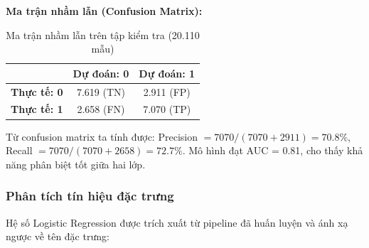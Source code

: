 \textbf{Ma trận nhầm lẫn (Confusion Matrix):}

\begin{table}[h]
\centering
\begin{tabular}{|l|c|c|}
\hline
 & \textbf{Dự đoán: 0} & \textbf{Dự đoán: 1} \\
\hline
\textbf{Thực tế: 0} & 7.619 (TN) & 2.911 (FP) \\
\hline
\textbf{Thực tế: 1} & 2.658 (FN) & 7.070 (TP) \\
\hline
\end{tabular}
\caption{Ma trận nhầm lẫn trên tập kiểm tra (20.110 mẫu)}
\end{table}

Từ confusion matrix ta tính được: Precision $= 7070/(7070+2911) = 70.8\%$, Recall $= 7070/(7070+2658) = 72.7\%$. Mô hình đạt AUC = 0.81, cho thấy khả năng phân biệt tốt giữa hai lớp.

\subsubsection{Phân tích tín hiệu đặc trưng}

Hệ số Logistic Regression được trích xuất từ pipeline đã huấn luyện và ánh xạ ngược về tên đặc trưng:

